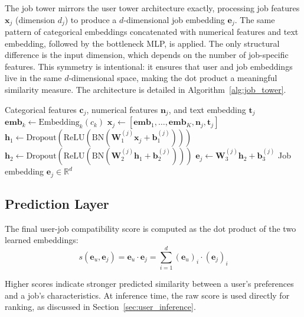 The job tower mirrors the user tower architecture exactly, processing job features $\mathbf{x}_j$ (dimension $d_j$) to produce a $d$-dimensional job embedding $\mathbf{e}_j$. The same pattern of categorical embeddings concatenated with numerical features and text embedding, followed by the bottleneck \gls{MLP}, is applied. The only structural difference is the input dimension, which depends on the number of job-specific features. This symmetry is intentional: it ensures that user and job embeddings live in the same $d$-dimensional space, making the dot product a meaningful similarity measure. The architecture is detailed in Algorithm~\ref{alg:job_tower}.
\begin{algorithm}[H]
\caption{Job Tower Forward Pass}
\label{alg:job_tower}
\begin{algorithmic}[1]
\Require Categorical features $\mathbf{c}_j$, numerical features $\mathbf{n}_j$, and text embedding $\mathbf{t}_j$
    \State $\mathbf{emb}_k \gets \text{Embedding}_{k}(c_k)$
\EndFor
\State $\mathbf{x}_j \gets [\mathbf{emb}_1, \ldots, \mathbf{emb}_K, \mathbf{n}_j, \mathbf{t}_j]$ 
\State $\mathbf{h}_1 \gets \text{Dropout}(\text{ReLU}(\text{BN}(\mathbf{W}_1^{(j)} \mathbf{x}_j + \mathbf{b}_1^{(j)})))$
\State $\mathbf{h}_2 \gets \text{Dropout}(\text{ReLU}(\text{BN}(\mathbf{W}_2^{(j)} \mathbf{h}_1 + \mathbf{b}_2^{(j)})))$
\State $\mathbf{e}_j \gets \mathbf{W}_3^{(j)} \mathbf{h}_2 + \mathbf{b}_3^{(j)}$
\Ensure Job embedding $\mathbf{e}_j \in \mathbb{R}^d$
\end{algorithmic}
\end{algorithm}

\subsection{Prediction Layer}
\label{sec:user_prediction}

The final user-job compatibility score is computed as the dot product of the two learned embeddings:
\begin{equation}
s(\mathbf{e}_u, \mathbf{e}_j) = \mathbf{e}_u \cdot \mathbf{e}_j = \sum_{i=1}^{d} (\mathbf{e}_u)_i \cdot (\mathbf{e}_j)_i
\end{equation}

Higher scores indicate stronger predicted similarity between a 
user's preferences and a job's characteristics. At inference time, 
the raw score is used directly for ranking, as discussed in 
Section~\ref{sec:user_inference}.

